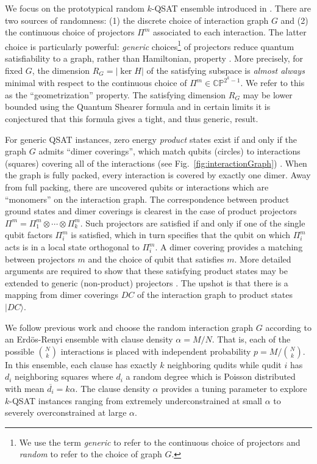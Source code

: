 \documentclass[aps,pra,twocolumn,superscriptaddress,amsmath]{revtex4-1}
\newcommand{\ket}[1]{|#1\rangle}
\begin{document}
We focus on the prototypical random $k$-QSAT ensemble introduced in \cite{LaumannQSAT2010_2}.
There are two sources of randomness: 
(1) the discrete choice of interaction graph $G$ and
(2) the continuous choice of projectors $\Pi^m$ associated to each interaction.
The latter choice is particularly powerful: \emph{generic} choices\footnote{We use the term \emph{generic} to refer to the continuous choice of projectors and \emph{random} to refer to the choice of graph $G$.} of projectors reduce quantum satisfiability to a graph, rather than Hamiltonian, property \cite{LaumannQSAT2010_2}. 
More precisely, for fixed $G$, the dimension $R_G = |\ker H|$ of the satisfying subspace is \emph{almost always} minimal with respect to the continuous choice of $\Pi^m \in \mathbb{CP}^{2^k-1}$. 
We refer to this as the ``geometrization'' property.
The satisfying dimension $R_G$ may be lower bounded using the Quantum Shearer formula \cite{Sattath2016} and in certain limits it is conjectured that this formula gives a tight, and thus generic, result.

For generic QSAT instances, zero energy \emph{product} states exist if and only if the graph $G$ admits ``dimer coverings'', which match qubits (circles) to interactions (squares) covering all of the interactions (see Fig.~\ref{fig:interactionGraph}) \cite{LaumannQSAT2010}. When the graph is fully packed, every interaction is covered by exactly one dimer. Away from full packing, there are uncovered qubits or interactions which are ``monomers'' on the interaction graph.
The correspondence between product ground states and dimer coverings is clearest in the case of product projectors $\Pi^m = \Pi^m_1 \otimes \cdots \otimes \Pi^m_k$. 
Such projectors are satisfied if and only if one of the single qubit factors $\Pi^m_i$ is satisfied, which in turn specifies that the qubit on which $\Pi^m_i$ acts is in a local state orthogonal to $\Pi^m_i$.
A dimer covering provides a matching between projectors $m$ and the choice of qubit that satisfies $m$.
More detailed arguments are required to show that these satisfying product states may be extended to generic (non-product) projectors \cite{LaumannQSAT2010}. The upshot is that there is a mapping from dimer coverings $DC$ of the interaction graph to product states $\ket{DC}$.

We follow previous work and choose the random interaction graph $G$ according to an Erd{\"o}s-Renyi ensemble with clause density $\alpha = M/N$.
That is, each of the possible $\binom{N}{k}$ interactions is placed with independent probability $p = M / \binom{N}{k}$. In this ensemble, each clause has exactly $k$ neighboring qudits while qudit $i$ has $d_i$ neighboring squares where $d_i$ a random degree which is Poisson distributed with mean $\overline{d_i} = k \alpha$.
The clause density $\alpha$ provides a tuning parameter to explore $k$-QSAT instances ranging from extremely underconstrained at small $\alpha$ to severely overconstrained at large $\alpha$. 
\end{document}
